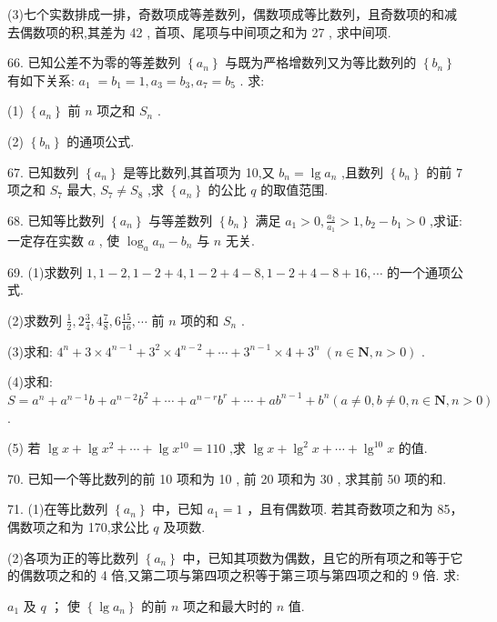 \documentclass[10pt]{article}
\newcommand*\circled[1]{\tikz[baseline=(char.base)]{\node[shape=circle,draw,inner sep=1.5pt] (char) {\small #1};}}
\begin{document}
(3)七个实数排成一排，奇数项成等差数列，偶数项成等比数列，且奇数项的和减去偶数项的积,其差为 42 , 首项、尾项与中间项之和为 27 , 求中间项.

66. 已知公差不为零的等差数列 \(\left\{  {a}_{n}\right\}\) 与既为严格增数列又为等比数列的 \(\left\{  {b}_{n}\right\}\) 有如下关系: \({a}_{1} \; = {b}_{1} = 1,{a}_{3} = {b}_{3},{a}_{7} = {b}_{5}\) . 求:

(1) \(\left\{  {a}_{n}\right\}\) 前 \(n\) 项之和 \({S}_{n}\) .

(2) \(\left\{  {b}_{n}\right\}\) 的通项公式.

67. 已知数列 \(\left\{  {a}_{n}\right\}\) 是等比数列,其首项为 10,又 \({b}_{n} = \lg {a}_{n}\) ,且数列 \(\left\{  {b}_{n}\right\}\) 的前 7 项之和 \({S}_{7}\) 最大, \({S}_{7} \neq  {S}_{8}\) ,求 \(\left\{  {a}_{n}\right\}\) 的公比 \(q\) 的取值范围.

68. 已知等比数列 \(\left\{  {a}_{n}\right\}\) 与等差数列 \(\left\{  {b}_{n}\right\}\) 满足 \({a}_{1} > 0,\frac{{a}_{2}}{{a}_{1}} > 1,{b}_{2} - {b}_{1} > 0\) ,求证: 一定存在实数 \(a\) , 使 \({\log }_{a}{a}_{n} - {b}_{n}\) 与 \(n\) 无关.

69. (1)求数列 \(1,1 - 2,1 - 2 + 4,1 - 2 + 4 - 8,1 - 2 + 4 - 8 + {16},\cdots\) 的一个通项公式.

(2)求数列 \(\frac{1}{2},2\frac{3}{4},4\frac{7}{8},6\frac{15}{16},\cdots\) 前 \(n\) 项的和 \({S}_{n}\) .

(3)求和: \({4}^{n} + 3 \times  {4}^{n - 1} + {3}^{2} \times  {4}^{n - 2} + \cdots  + {3}^{n - 1} \times  4 + {3}^{n}\;\left( {n \in  \mathbf{N},n > 0}\right)\) .

(4)求和: \(S = {a}^{n} + {a}^{n - 1}b + {a}^{n - 2}{b}^{2} + \cdots  + {a}^{n - r}{b}^{r} + \cdots  + a{b}^{n - 1} + {b}^{n}\left( {a \neq  0,b \neq  0,n \in  \mathbf{N},n > 0}\right)\) .

(5) 若 \(\lg x + \lg {x}^{2} + \cdots  + \lg {x}^{10} = {110}\) ,求 \(\lg x + {\lg }^{2}x + \cdots  + {\lg }^{10}x\) 的值.

70. 已知一个等比数列的前 10 项和为 10 , 前 20 项和为 30 , 求其前 50 项的和.

71. (1)在等比数列 \(\left\{  {a}_{n}\right\}\) 中，已知 \({a}_{1} = 1\) ，且有偶数项. 若其奇数项之和为 85，偶数项之和为 170,求公比 \(q\) 及项数.

(2)各项为正的等比数列 \(\left\{  {a}_{n}\right\}\) 中，已知其项数为偶数，且它的所有项之和等于它的偶数项之和的 4 倍,又第二项与第四项之积等于第三项与第四项之和的 9 倍. 求:

 \circled{1}  \({a}_{1}\) 及 \(q\) ； \circled{2} 使 \(\left\{  {\lg {a}_{n}}\right\}\) 的前 \(n\) 项之和最大时的 \(n\) 值.
\end{document}

